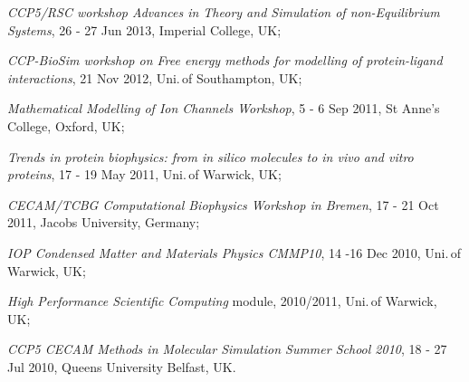 \documentclass[a4paper,10pt,final]{letter}
\begin{document}
\begin{compactitem}[\color{RoyalBlue}$\circ$]
\item \textit{CCP5/RSC workshop Advances in Theory and Simulation of non-Equilibrium Systems},
  26 - 27 Jun 2013, Imperial College, UK;
\item \textit{CCP-BioSim workshop on Free energy methods for modelling of protein-ligand
  interactions}, 21 Nov 2012, Uni.\,of Southampton, UK;
\item \textit{Mathematical Modelling of Ion Channels Workshop}, 5 - 6 Sep 2011, St Anne's
  College, Oxford, UK;
\item \textit{Trends in protein biophysics: from in silico molecules to in vivo and vitro
  proteins}, 17 - 19 May 2011, Uni.\,of Warwick, UK;
\item \textit{CECAM/TCBG Computational Biophysics Workshop in Bremen},  17 - 21 Oct 2011,
  Jacobs University, Germany;  
\item \textit{IOP Condensed Matter and Materials Physics CMMP10}, 14 -16 Dec 2010,
  Uni.\,of Warwick, UK;
\item \textit{High Performance Scientific Computing} module, 2010/2011, Uni.\,of Warwick,
  UK;
\item \textit{CCP5 CECAM Methods in Molecular Simulation Summer School 2010}, 18 - 27 Jul 2010, Queens University
  Belfast, UK.
\end{compactitem}
\end{document}
